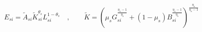 \begin{equation}
    \label{eq:firm_emission}
    E_{si} = \tilde{A}_{si}\tilde{K}_{si}^{\theta_s} L_{si}^{1-\theta_s} \quad,\qquad \tilde{K} = (
        \mu_s G_{si}^{\frac{\eta_s-1}{\eta_s}} + (1-\mu_s) B_{si}^{\frac{\eta_s-1}{\eta_s}}
    ) ^ {\frac{\eta_s}{\eta_s-1}}
\end{equation}